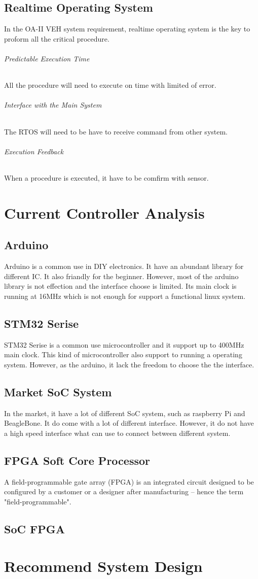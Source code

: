 \documentclass[12pt,article]{memoir}
\begin{document}
\section{Realtime Operating System}
In the OA-II VEH system requirement, realtime operating system is the key to proform all the critical procedure.
\subparagraph{Predictable Execution Time}All the procedure will need to execute on time with limited of error.
\subparagraph{Interface with the Main System}The RTOS will need to be have to receive command from other system.
\subparagraph{Execution Feedback}When a procedure is executed, it have to be comfirm with sensor.
\newpage
\chapter{Current Controller Analysis}
\section{Arduino}
Arduino is a common use in DIY electronics. It have an abundant library for different IC. It also friandly for the beginner. However, most of the arduino library is not effection and the interface choose is limited. Its main clock is running at 16MHz which is not enough for support a functional linux system.
\section{STM32 Serise}
STM32 Serise is a common use microcontroller and it support up to 400MHz main clock. This kind of microcontroller also support to running a operating system. However, as the arduino, it lack the freedom to choose the the interface. 
\section{Market SoC System}
In the market, it have a lot of different SoC system, such as raspberry Pi and BeagleBone. It do come with a lot of different interface. However, it do not have a high speed interface what can use to connect between different system.
\section{FPGA Soft Core Processor}
A field-programmable gate array (FPGA) is an integrated circuit designed to be configured by a customer or a designer after manufacturing – hence the term "field-programmable".
\section{SoC FPGA}
\newpage
\chapter{Recommend System Design}
\end{document}
